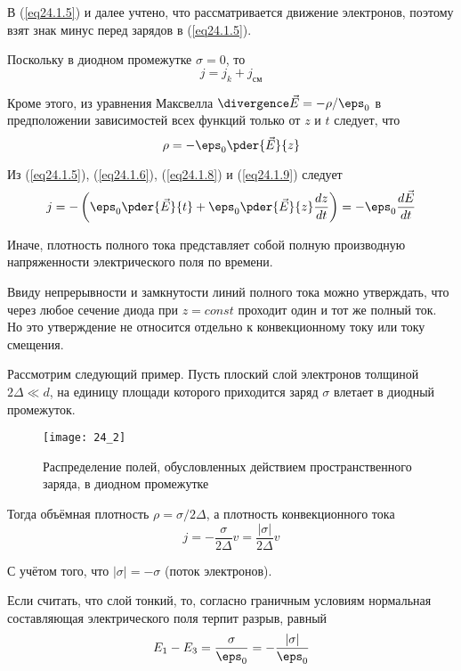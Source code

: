 В (\ref{eq24.1.5}) и далее учтено, что рассматривается движение электронов, 
поэтому взят знак минус перед зарядов в (\ref{eq24.1.5}).

Поскольку в диодном промежутке \( \sigma = 0 \), то 
\begin{equation}
	j = j_k + j_\text{см}
	\label{eq24.1.8}
\end{equation}

Кроме этого, из уравнения Максвелла \( \divergence\vec{E} = -\rho/\eps_0 \) в 
предположении зависимостей всех функций только от \( z \) и \( t \) следует, 
что 
\begin{equation}
	\rho = -\eps_0 \pder{\vec{E}}{z}
	\label{eq24.1.9}
\end{equation}

Из (\ref{eq24.1.5}), (\ref{eq24.1.6}), (\ref{eq24.1.8}) и (\ref{eq24.1.9}) следует 
\[
	j = -\left( 
		\eps_0\pder{\vec{E}}{t} + \eps_0\pder{\vec{E}}{z}\frac{dz}{dt}
	\right) = -\eps_0 \frac{d\vec{E}}{dt}
\]

Иначе, плотность полного тока представляет собой полную производную 
напряженности электрического поля по времени.

Ввиду непрерывности и замкнутости линий полного тока можно утверждать, что 
через любое сечение диода при \( z = const \) проходит один и тот же полный 
ток. Но это утверждение не относится отдельно к конвекционному току или току 
смещения. 

Рассмотрим следующий пример. Пусть плоский слой электронов толщиной 
\( 2\Delta \ll d \), на единицу площади которого приходится заряд \( \sigma \) 
влетает в диодный промежуток.

\begin{figure}[h!]
	\center
	\texttt{[image: 24\_2]}
	\caption{Распределение полей, обусловленных действием пространственного 
		заряда, в диодном промежутке}
	\label{img24.2}
\end{figure}

Тогда объёмная плотность \( \rho = \sigma / 2\Delta \), а плотность 
конвекционного тока 
\begin{equation}
	j = -\frac{\sigma}{2\Delta}v = \frac{|\sigma|}{2\Delta} v
	\label{eq24.1.11}
\end{equation}

С учётом того, что \( |\sigma| = -\sigma \) (поток электронов).

Если считать, что слой тонкий, то, согласно граничным условиям нормальная 
составляющая электрического поля терпит разрыв, равный 
\begin{equation}
	E_1 - E_3 = \frac{\sigma}{\eps_0} = -\frac{|\sigma|}{\eps_0}
	\label{eq24.1.12}
\end{equation}

